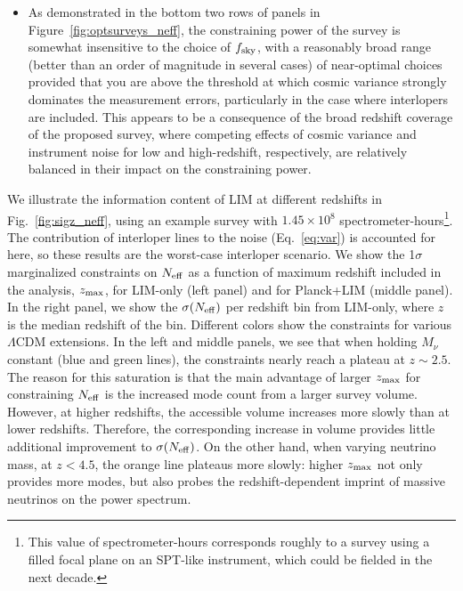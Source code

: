 \documentclass[twocolumn]{aastex631}
\begin{document}
\begin{itemize}[leftmargin=.22in,itemsep=.02in]
    \item As demonstrated in the bottom two rows of panels in Figure~\ref{fig:optsurveys_neff}, the constraining power of the survey is somewhat insensitive to the choice of $f_{\rm sky}$, with a reasonably broad range (better than an order of magnitude in several cases) of near-optimal choices provided that you are above the threshold at which cosmic variance strongly dominates the measurement errors, particularly in the case where interlopers are included. This appears to be a consequence of the broad redshift coverage of the proposed survey, where competing effects of cosmic variance and instrument noise for low and high-redshift, respectively, are relatively balanced in their impact on the constraining power.
\end{itemize}


We illustrate the information content of LIM at different redshifts in Fig.~\ref{fig:sigz_neff}, using an example survey with $1.45\times10^8$ spectrometer-hours\footnote{This value of spectrometer-hours corresponds roughly to a survey using a filled focal plane on an SPT-like instrument, which could be fielded in the next decade.}. The contribution of interloper lines to the noise (Eq.~\ref{eq:var}) is accounted for here, so these results are the worst-case interloper scenario. We show the 1$\sigma$ marginalized constraints on $N_{\rm eff}$ as a function of maximum redshift included in the analysis, $z_{\rm max}$, for LIM-only (left panel) and for Planck+LIM (middle panel). In the right panel, we show the $\sigma(N_{\rm eff})$ per redshift bin from LIM-only, where $z$ is the median redshift of the bin. Different colors show the constraints for various $\Lambda$CDM extensions. In the left and middle panels, we see that when holding $M_\nu$ constant (blue and green lines), the constraints nearly reach a plateau at $z \sim 2.5$. The reason for this saturation is that the main advantage of larger $z_{\rm max}$ for constraining $N_{\rm eff}$ is the increased mode count from a larger survey volume. However, at higher redshifts, the accessible volume increases more slowly than at lower redshifts. Therefore, the corresponding increase in volume provides little additional improvement to $\sigma(N_{\rm eff})$. On the other hand, when varying neutrino mass, at $z<4.5$, the orange line plateaus more slowly: higher $z_{\rm max}$ not only provides more modes, but also probes the redshift-dependent imprint of massive neutrinos on the power spectrum. 
\end{document}
